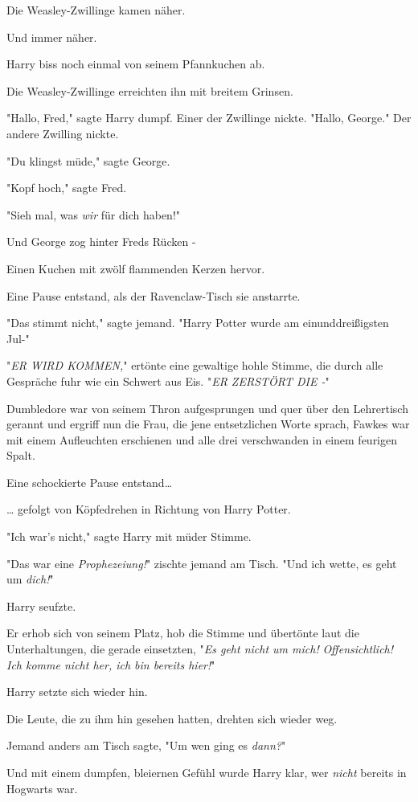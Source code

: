 {Die Weasley-Zwillinge kamen näher.

Und immer näher.

Harry biss noch einmal von seinem Pfannkuchen ab.

Die Weasley-Zwillinge erreichten ihn mit breitem Grinsen.

"Hallo, Fred," sagte Harry dumpf. Einer der Zwillinge nickte. "Hallo, George." Der andere Zwilling nickte.

"Du klingst müde," sagte George.

"Kopf hoch," sagte Fred.

"Sieh mal, was \emph{wir} für dich haben!"

Und George zog hinter Freds Rücken -

Einen Kuchen mit zwölf flammenden Kerzen hervor.

Eine Pause entstand, als der Ravenclaw-Tisch sie anstarrte.

"Das stimmt nicht," sagte jemand. "Harry Potter wurde am einunddreißigsten Jul-"

"\emph{ER WIRD KOMMEN,}" ertönte eine gewaltige hohle Stimme, die durch alle Gespräche fuhr wie ein Schwert aus Eis. "\emph{ER ZERSTÖRT DIE -}"

Dumbledore war von seinem Thron aufgesprungen und quer über den Lehrertisch gerannt und ergriff nun die Frau, die jene entsetzlichen Worte sprach, Fawkes war mit einem Aufleuchten erschienen und alle drei verschwanden in einem feurigen Spalt.

Eine schockierte Pause entstand…

… gefolgt von Köpfedrehen in Richtung von Harry Potter.

"Ich war's nicht," sagte Harry mit müder Stimme.

"Das war eine \emph{Prophezeiung!}" zischte jemand am Tisch. "Und ich wette, es geht um \emph{dich!}"

Harry seufzte.

Er erhob sich von seinem Platz, hob die Stimme und übertönte laut die Unterhaltungen, die gerade einsetzten, "\emph{Es geht nicht um mich!} \emph{Offensichtlich! Ich komme nicht her, ich bin bereits hier!}"

Harry setzte sich wieder hin.

Die Leute, die zu ihm hin gesehen hatten, drehten sich wieder weg.

Jemand anders am Tisch sagte, "Um wen ging es \emph{dann?}"

Und mit einem dumpfen, bleiernen Gefühl wurde Harry klar, wer \emph{nicht} bereits in Hogwarts war.

}

